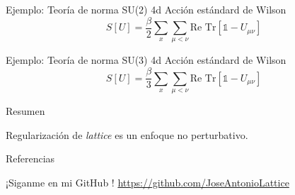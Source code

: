 \documentclass[11pt]{beamer}
\begin{document}
\begin{frame}{Ejemplo: Teoría de norma SU(2) 4d}
Acción estándard de Wilson
$$ S[U] = \frac{\beta}{2}\sum_{x}\sum_{\mu < \nu} \text{Re Tr} \left[\mathds{1} - U_{\mu\nu} \right] $$
\end{frame}


\begin{frame}{Ejemplo: Teoría de norma SU(3) 4d}
Acción estándard de Wilson
$$ S[U] = \frac{\beta}{3}\sum_{x}\sum_{\mu < \nu} \text{Re Tr} \left[\mathds{1} - U_{\mu\nu} \right] $$
\end{frame}


\begin{frame}{Resumen}

Regularización de \emph{lattice} es un enfoque no perturbativo.
    
\end{frame}

\begin{frame}{Referencias}

¡Siganme en mi GitHub \faGithub !
\url{https://github.com/JoseAntonioLattice}
\end{frame}
\end{document}
